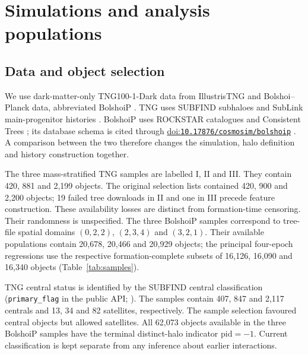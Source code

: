 \documentclass[11pt,a4paper]{article}
\newcommand{\doi}[1]{\href{https://doi.org/#1}{doi:\nolinkurl{#1}}}
\begin{document}
\section{Simulations and analysis populations}
\subsection{Data and object selection}
We use dark-matter-only TNG100-1-Dark data from IllustrisTNG \citep{Nelson2019} and Bolshoi--Planck data, abbreviated BolshoiP \citep{Klypin2016,RodriguezPuebla2016}. TNG uses SUBFIND subhaloes and SubLink main-progenitor histories \citep{Springel2001,RG2015}. BolshoiP uses ROCKSTAR catalogues and Consistent Trees \citep{Behroozi2013a,Behroozi2013b}; its database schema is cited through \doi{10.17876/cosmosim/bolshoip} \citep{CosmoBolshoiP}. A comparison between the two therefore changes the simulation, halo definition and history construction together.

The three mass-stratified TNG samples are labelled I, II and III. They contain 420, 881 and 2,199 objects. The original selection lists contained 420, 900 and 2,200 objects; 19 failed tree downloads in II and one in III precede feature construction. These availability losses are distinct from formation-time censoring. Their randomness is unspecified. The three BolshoiP samples correspond to tree-file spatial domains $(0,2,2)$, $(2,3,4)$ and $(3,2,1)$. Their available populations contain 20,678, 20,466 and 20,929 objects; the principal four-epoch regressions use the respective formation-complete subsets of 16,126, 16,090 and 16,340 objects (Table~\ref{tab:samples}).

TNG central status is identified by the SUBFIND central classification (\texttt{primary\_flag} in the public API; \citealt{TNGAPI}). The samples contain 407, 847 and 2,117 centrals and 13, 34 and 82 satellites, respectively. The sample selection favoured central objects but allowed satellites. All 62,073 objects available in the three BolshoiP samples have the terminal distinct-halo indicator $\mathrm{pid}=-1$. Current classification is kept separate from any inference about earlier interactions.

\begin{table}[htbp]\centering\small

\caption{TNG selection and current classification. ``Failed'' denotes a failed tree download before feature construction. Fitted counts refer to the mixed populations.}\label{tab:population}
\end{table}
\begin{table}[htbp]\centering\small

\caption{Analysis populations and fiducial weighting parameters $\gamma_{\rm f}$. $n_{\rm all}$ is available to the baseline regression and $n_4$ has the four formation controls. The same symbol $\gamma$ labels different numerical operators in TNG and BolshoiP.}\label{tab:samples}
\end{table}
\end{document}
